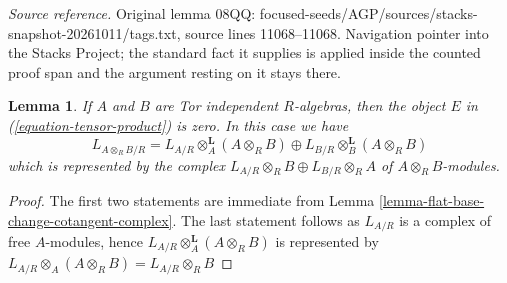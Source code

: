 \documentclass[10pt,a4paper]{amsart}
\theoremstyle{plain}
\newtheorem{lemma}[subsection]{Lemma}
\theoremstyle{definition}
\theoremstyle{remark}
\numberwithin{equation}{subsection}
\begin{document}
\noindent\textit{Source reference.} Original lemma 08QQ: focused-seeds/AGP/sources/stacks-snapshot-20261011/tags.txt, source lines 11068--11068. Navigation pointer into the Stacks Project; the standard fact it supplies is applied inside the counted proof span and the argument resting on it stays there.\par\medskip
\begin{lemma}
\label{lemma-tensor-product-tor-independent}
If $A$ and $B$ are Tor independent $R$-algebras, then the object $E$
in (\ref{equation-tensor-product}) is zero. In this case we have
$$
L_{A \otimes_R B/R} =
L_{A/R} \otimes_A^\mathbf{L} (A \otimes_R B) \oplus
L_{B/R} \otimes_B^\mathbf{L} (A \otimes_R B)
$$
which is represented by the complex
$L_{A/R} \otimes_R B \oplus L_{B/R} \otimes_R A $
of $A \otimes_R B$-modules.
\end{lemma}

\begin{proof}
The first two statements are immediate from
Lemma \ref{lemma-flat-base-change-cotangent-complex}.
The last statement follows as $L_{A/R}$ is a complex
of free $A$-modules, hence $L_{A/R} \otimes_A^\mathbf{L} (A \otimes_R B)$
is represented by
$L_{A/R} \otimes_A (A \otimes_R B) = L_{A/R} \otimes_R B$
\end{proof}
\end{document}
